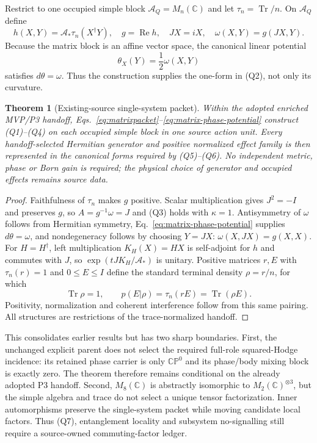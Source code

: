 \documentclass[11pt]{article}
\newtheorem{theorem}{Theorem}
\newcommand{\Tr}{\operatorname{Tr}}
\begin{document}
Restrict to one occupied simple block $\mathcal A_Q=M_n(\mathbb C)$ and let
$\tau_n=\Tr/n$.  On $\mathcal A_Q$ define
\begin{equation}
 h(X,Y)=\mathcal A_*\tau_n(X^\dagger Y),\quad
 g=\operatorname{Re}h,\quad JX=iX,\quad
 \omega(X,Y)=g(JX,Y).
 \label{eq:matrixpacket}
\end{equation}
Because the matrix block is an affine vector space, the canonical linear
potential
\begin{equation}
 \theta_X(Y)=\frac12\omega(X,Y)
 \label{eq:matrix-phase-potential}
\end{equation}
satisfies $d\theta=\omega$.  Thus the construction supplies the one-form in
(Q2), not only its curvature.

\begin{theorem}[Existing-source single-system packet]
\label{thm:existingsource}
Within the adopted enriched MVP/P3 handoff,
Eqs.~\eqref{eq:matrixpacket}--\eqref{eq:matrix-phase-potential} construct
(Q1)--(Q4) on each occupied simple block in one source action unit.  Every
handoff-selected Hermitian generator and positive normalized effect family is
then represented in the canonical forms required by (Q5)--(Q6).  No
independent metric, phase or Born gain is required; the physical choice of
generator and occupied effects remains source data.
\end{theorem}

\begin{proof}
Faithfulness of $\tau_n$ makes $g$ positive.  Scalar multiplication gives
$J^2=-I$ and preserves $g$, so $A=g^{-1}\omega=J$ and (Q3) holds with
$\kappa=1$.  Antisymmetry of $\omega$ follows from Hermitian symmetry,
Eq.~\eqref{eq:matrix-phase-potential} supplies $d\theta=\omega$, and
nondegeneracy follows by choosing $Y=JX$:
$\omega(X,JX)=g(X,X)$.  For $H=H^\dagger$, left multiplication
$K_H(X)=HX$ is self-adjoint for $h$ and commutes with $J$, so
$\exp(tJK_H/\mathcal A_*)$ is unitary.  Positive matrices $r,E$ with
$\tau_n(r)=1$ and $0\le E\le I$ define the standard terminal density
$\rho=r/n$, for which
\begin{equation}
 \Tr\rho=1,
 \qquad
 p(E|\rho)=\tau_n(rE)=\Tr(\rho E).
\end{equation}
Positivity, normalization and coherent interference follow from this same
pairing.  All structures are restrictions of the trace-normalized handoff.
\end{proof}

This consolidates earlier results but has two sharp boundaries.  First, the
unchanged explicit parent does not select the required full-role
squared-Hodge incidence: its retained phase carrier is only
$\mathbb{CP}^0$ and its phase/body mixing block is exactly zero.  The theorem
therefore remains conditional on the already adopted P3 handoff.  Second,
$M_8(\mathbb C)$ is abstractly isomorphic to
$M_2(\mathbb C)^{\otimes3}$, but the simple algebra and trace do not select a
unique tensor factorization.  Inner automorphisms preserve the single-system
packet while moving candidate local factors.  Thus (Q7), entanglement
locality and subsystem no-signalling still require a source-owned
commuting-factor ledger.
\end{document}
